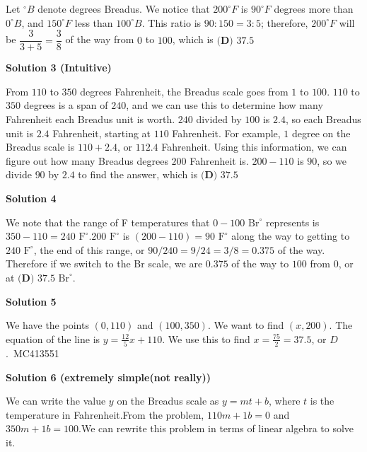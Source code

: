\begin{enumerate}
Let $^\circ B$ denote degrees Breadus. We notice that $200^\circ F$ is $90^\circ F$ degrees more than $0^\circ B$, and $150^\circ F$ less than $100^\circ B$. This ratio is $90:150=3:5$; therefore, $200^\circ F$ will be $\dfrac3{3+5}=\dfrac38$ of the way from $0$ to $100$, which is $\boxed{\textbf{(D) }37.5}$




\textbf{Solution 3 (Intuitive)}

From $110$ to $350$ degrees Fahrenheit, the Breadus scale goes from $1$ to $100$. $110$ to $350$ degrees is a span of $240$, and we can use this to determine how many Fahrenheit each Breadus unit is worth. $240$ divided by $100$ is $2.4$, so each Breadus unit is $2.4$ Fahrenheit, starting at $110$ Fahrenheit. For example, $1$ degree on the Breadus scale is $110 + 2.4$, or $112.4$ Fahrenheit. Using this information, we can figure out how many Breadus degrees $200$ Fahrenheit is. $200-110$ is $90$, so we divide $90$ by $2.4$ to find the answer, which is $\boxed{\textbf{(D) }37.5}$




\textbf{Solution 4}

We note that the range of F temperatures that $0-100$ $\text{Br}^\circ$ represents is $350-110 = 240$ $\text{F}^\circ$.$200$ $\text{F}^\circ$ is $(200-110) = 90$ $\text{F}^\circ$ along the way to getting to $240$ $\text{F}^\circ$, the end of this range, or $90/240 = 9/24 = 3/8 = 0.375$ of the way. Therefore if we switch to the Br scale, we are $0.375$ of the way to $100$ from $0$, or at $\boxed{\textbf{(D) }37.5}$ $\text{Br}^\circ$.

 



\textbf{Solution 5}

We have the points $(0, 110)$ and $(100, 350)$. We want to find $(x, 200)$. The equation of the line is $y=\frac{12}{5}x+110$. We use this to find $x=\frac{75}{2}=37.5$, or $\boxed{D}$.~MC413551

 



\textbf{Solution 6 (extremely simple(not really))}

We can write the value $y$ on the Breadus scale as $y = mt + b$, where $t$ is the temperature in Fahrenheit.From the problem, $110m + 1b = 0$ and $350m + 1b = 100.$We can rewrite this problem in terms of linear algebra to solve it.


\end{enumerate}

